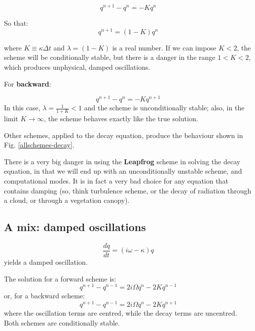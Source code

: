 \begin{equation}
	q^{n+1} -q^n = -K q^n
	\label{decay-solution-euler2}
\end{equation}

So that: 
\begin{equation}
	q^{n+1} = (1-K) q^n
	\label{decay-solution-euler3}
\end{equation}

where $K \equiv \kappa \Delta t$ and $\lambda = (1-K)$ is a real number. If we can impose $K < 2$, the scheme will be conditionally stable, but there is a danger in the range $1< K < 2$, which produces unphysical, damped oscillations.

For {\bf backward}:

\begin{equation}
	q^{n+1} -q^n = -K q^{n+1}
	\label{decay-solution-implicit}
\end{equation}
In this case, $\lambda = \frac{1}{1+K}<1$ and the scheme is unconditionally stable; also, in the limit $K \rightarrow \infty$, the scheme behaves exactly like the true solution.

Other schemes, applied to the decay equation, produce the behaviour shown in Fig. \ref{allschemes-decay}.

There is a very big danger in using the {\bf Leapfrog} scheme in solving the decay equation, in that we will end up with an unconditionally unstable scheme, and computational modes. It is in fact a very bad choice for any equation that contains damping (so, think turbulence scheme, or the decay of radiation through a cloud, or through a vegetation canopy).

 
\subsection{A mix: damped oscillations}

\begin{equation}
	\frac{dq}{dt}= (i\omega - \kappa) q
	\label{decay}
\end{equation}
yields a damped oscillation.

The solution for a forward scheme is:
\begin{equation}
	q^{n+1} -q^{n-1}= 2i\Omega q^n - 2K q^{n-1}
	\label{oscill-decay-solution-forward}
\end{equation}
or, for a backward scheme:
\begin{equation}
	q^{n+1} -q^{n-1}= 2i\Omega q^n - 2K q^{n+1}
	\label{oscill-decay-solution-forward}
\end{equation}
where the oscillation terms are centred, while the decay terms are uncentred.
Both schemes are conditionally stable.

